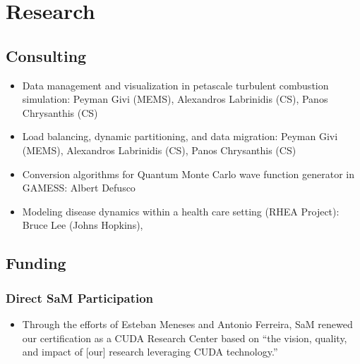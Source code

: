 \chapter{Research}

\section{Consulting}
\begin{itemize}
   \item Data management and visualization in petascale turbulent
         combustion simulation: Peyman Givi (MEMS), Alexandros
         Labrinidis (CS), Panos Chrysanthis (CS)
   \item Load balancing, dynamic partitioning, and data migration: Peyman
         Givi (MEMS), Alexandros Labrinidis (CS), Panos Chrysanthis (CS)
   \item Conversion algorithms for Quantum Monte Carlo wave function generator in GAMESS: Albert Defusco
   \item Modeling disease dynamics within a health care setting (RHEA Project): Bruce Lee (Johns Hopkins), 
\end{itemize}

\section{Funding}
\subsection{Direct SaM Participation}
\begin{itemize}
   \item Through the efforts of Esteban Meneses and Antonio Ferreira, SaM renewed our certification as a CUDA Research Center based on ``the vision,
quality, and impact of [our] research leveraging CUDA technology.''
\end{itemize}

